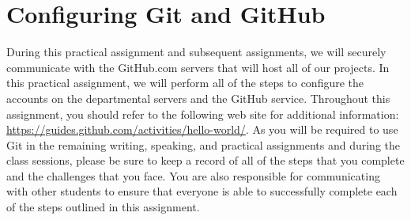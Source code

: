 \section*{Configuring Git and GitHub}

During this practical assignment and subsequent assignments, we will securely communicate with the GitHub.com servers
that will host all of our projects. In this practical assignment, we will perform all of the steps to configure the
accounts on the departmental servers and the GitHub service. Throughout this assignment, you should refer to the
following web site for additional information: \url{https://guides.github.com/activities/hello-world/}. As you will be
required to use Git in the remaining writing, speaking, and practical assignments and during the class sessions, please
be sure to keep a record of all of the steps that you complete and the challenges that you face. You are also
responsible for communicating with other students to ensure that everyone is able to successfully complete each of the
steps outlined in this assignment.


